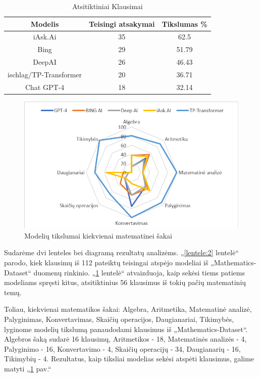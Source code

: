 \documentclass[conference]{IEEEtran}
\begin{document}
\begin{table}[h!]
        \centering
        \caption{Atsitiktiniai Klausimai}
        \label{lentele:3}
        \begin{tabular}{|c c c|} 
        \hline
        Modelis & Teisingi atsakymai & Tikslumas \% \\ [0.5ex] 
        \hline\hline
        iAsk.Ai & 35 & 62.5 \\
        \hline
        Bing & 29 & 51.79 \\
        \hline
        DeepAI & 26 & 46.43 \\
        \hline
        ischlag/TP-Transformer & 20 & 36.71 \\
        \hline
        Chat GPT-4 & 18 & 32.14 \\
        \hline
    \end{tabular}
    \end{table}
\begin{figure}[h!]
    \centering
    \includegraphics[scale=0.5]{lentele.png}
    \caption{Modelių tikslumai kiekvienai matematinei šakai}
    \label{pav:2}
\end{figure}
    
Sudarėme dvi lenteles bei diagramą rezultatų analizėms. „\ref{lentele:2} lentelė“ parodo, kiek klausimų iš 112 pateiktų
teisingai atspėjo modeliai iš „Mathematics-Dataset“ \cite{dataset} duomenų rinkinio. „\ref{lentele:3} lentelė“  atvaizduoja,
kaip sekėsi tiems patiems modeliams spręsti kitus, atsitiktinius 56 klausimus iš tokių pačių matematinių temų.



Toliau, kiekvienai matematikos šakai: Algebra, Aritmetika, Matematinė analizė, Palyginimas, Konvertavimas, Skaičių operacijos, Daugianariai, Tikimybės, lyginome modelių tikslumą panaudodami klausimus iš „Mathematics-Dataset“. Algebros šaką sudarė 16 klausimų, Aritmetikos - 18, Matematinės analizės - 4, Palyginimo - 16, Konvertavimo - 4, Skaičių operacijų - 34, Daugianarių - 16, Tikimybių - 4. Rezultatus, kaip tiksliai modelias sekėsi atspėti klausimus, galime matyti „\ref{pav:2} pav.“
\end{document}

